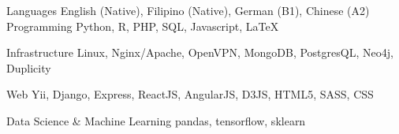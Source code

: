 

\begin{cvskills}

  \cvskill
    {Languages} %
    {English (Native), Filipino (Native), German (B1), Chinese (A2)} %
  \cvskill
    {Programming} %
    {Python, R, PHP, SQL, Javascript, LaTeX} %

  \cvskill
    {Infrastructure}
    {Linux, Nginx/Apache, OpenVPN, MongoDB, PostgresQL, Neo4j, Duplicity}

  \cvskill
    {Web} %
    {Yii, Django, Express, ReactJS, AngularJS, D3JS, HTML5, SASS, CSS} %

\cvskill
  {Data Science \& Machine Learning} %
  {pandas, tensorflow, sklearn} %

\end{cvskills}
